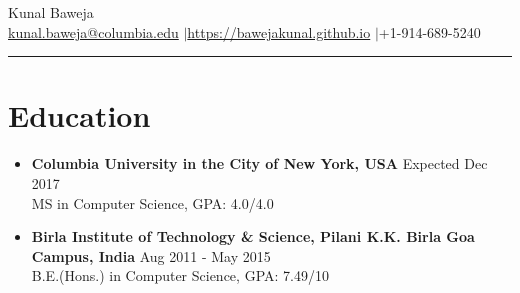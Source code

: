 \documentclass{article}
\def\name{Kunal Baweja}
\begin{document}
\begin{center}
{\huge \name}\\
\href{mailto:kunal.baweja@columbia.edu}{kunal.baweja@columbia.edu} $|$\hspace{3pt}\href{https://bawejakunal.github.io}{https://bawejakunal.github.io} $|$\hspace{3pt}+1-914-689-5240
\end{center}

\hrule
\vspace{5pt}

\vspace{-1mm}
\section*{Education}
\begin{itemize}

    \item \textbf{Columbia University in the City of New York, USA} {\hfill Expected Dec 2017}\\
    MS in Computer Science, GPA: 4.0/4.0
    
    \item \textbf{Birla Institute of Technology \& Science, Pilani K.K. Birla Goa Campus, India} {\hfill Aug 2011 - May 2015}\\
    B.E.(Hons.) in Computer Science, GPA: 7.49/10

\end{itemize}

\vspace{-2mm}
\end{document}
